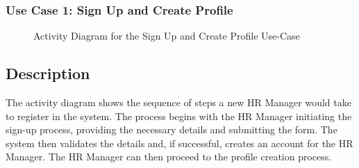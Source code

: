 \subsubsection{Use Case 1: Sign Up and Create Profile} 


\begin{figure}[H]
    \centering
    \caption{ Activity Diagram for the Sign Up and Create Profile Use-Case }
    \label{fig:UseCase1_Activity_Diagram}
\end{figure}

\subsection*{Description}
The activity diagram shows the sequence of steps a new HR Manager would take to register in the system. The process begins with the HR Manager initiating the sign-up process, providing the necessary details and submitting the form. The system then validates the details and, if successful, creates an account for the HR Manager. The HR Manager can then proceed to the profile creation process.


